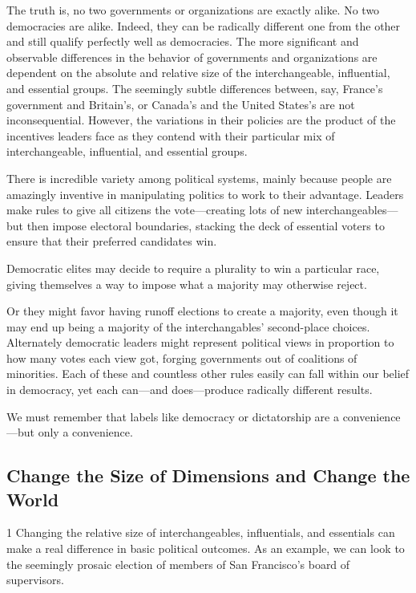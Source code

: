 \documentclass[10pt]{article}
\begin{document}
{\large The truth is, no two governments or organizations are exactly alike. No
two democracies are alike. Indeed, they can be radically different one from the
other and still qualify perfectly well as democracies. The more significant and
observable differences in the behavior of governments and organizations are
dependent on the absolute and relative size of the interchangeable, influential,
and essential groups. The seemingly subtle differences between, say, France's
government and Britain's, or Canada's and the United States's are not
inconsequential. However, the variations in their policies are the product of the
incentives leaders face as they contend with their particular mix of
interchangeable, influential, and essential groups.}

{\large There is incredible variety among political systems, mainly because
people are amazingly inventive in manipulating politics to work to their
advantage. Leaders make rules to give all citizens the vote---creating lots of
new interchangeables---but then impose electoral boundaries, stacking the deck of
essential voters to ensure that their preferred candidates win.}

{\large Democratic elites may decide to require a plurality to win a particular
race, giving themselves a way to impose what a majority may otherwise reject.}

{\large Or they might favor having runoff elections to create a majority, even
though it may end up being a majority of the interchangables' second-place
choices. Alternately democratic leaders might represent political views in
proportion to how many votes each view got, forging governments out of coalitions
of minorities. Each of these and countless other rules easily can fall within our
belief in democracy, yet each can---and does---produce radically different
results.}

{\large We must remember that labels like democracy or dictatorship are a
convenience---but only a convenience.}

\subsection{Change the Size of Dimensions and Change the World}

{\large 1 Changing the relative size of interchangeables, influentials, and
essentials can make a real difference in basic political outcomes. As an example,
we can look to the seemingly prosaic election of members of San Francisco's board
of supervisors.}
\end{document}
